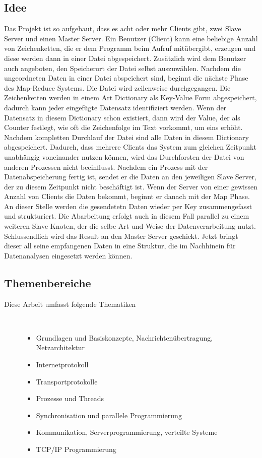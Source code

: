 \documentclass[a4paper,12pt]{article}
\begin{document}
\subsection{Idee}
Das Projekt ist so aufgebaut, dass es acht oder mehr Clients gibt, zwei Slave Server und einen Master Server. 
Ein Benutzer (Client) kann eine beliebige Anzahl von Zeichenketten, die er dem Programm beim Aufruf mitübergibt, 
erzeugen und diese werden dann in einer Datei abgespeichert. 
Zusätzlich wird dem Benutzer auch angeboten, den Speicherort der Datei selbst auszuwählen. 
Nachdem die ungeordneten Daten in einer Datei 
abspeichert sind, beginnt die nächste Phase des Map-Reduce Systems.
Die Datei wird zeilenweise durchgegangen. 
Die Zeichenketten werden in einem Art Dictionary als Key-Value Form abgespeichert, dadurch kann jeder eingefügte Datensatz identifiziert werden. 
Wenn der Datensatz in diesem Dictionary schon existiert, dann wird der Value, der als Counter festlegt, wie oft die Zeichenfolge im Text vorkommt, um eins erhöht. 
Nachdem kompletten Durchlauf der Datei sind alle Daten in diesem Dictionary abgespeichert. 
Dadurch, dass mehrere Clients das System zum gleichen Zeitpunkt unabhängig voneinander nutzen können, wird das Durchforsten der Datei von anderen Prozessen nicht beeinflusst. 
Nachdem ein Prozess mit der Datenabspeicherung fertig ist, sendet er die Daten an den jeweiligen Slave Server, der zu diesem Zeitpunkt nicht beschäftigt ist. 
Wenn der Server von einer gewissen Anzahl von Clients die Daten bekommt, beginnt er danach mit der Map Phase. 
An dieser Stelle werden die gesendetetn Daten wieder per Key zusammengefasst und strukturiert. 
Die Abarbeitung erfolgt auch in diesem Fall parallel zu einem weiteren Slave Knoten, der die selbe Art und Weise der Datenverarbeitung nutzt. 
Schlussendlich wird das Result an den Master Server geschickt. Jetzt bringt dieser all seine empfangenen Daten in eine Struktur, die im Nachhinein für Datenanalysen eingesetzt werden können.
\subsection{Themenbereiche}
\begin{description}
    \item[Diese Arbeit umfasst folgende Thematiken] ~\par
    \begin{itemize}
        \item Grundlagen und Basiskonzepte, Nachrichtenübertragung, Netzarchitektur
        \item Internetprotokoll
        \item Transportprotokolle
        \item Prozesse und Threads
        \item Synchronisation und parallele Programmierung
        \item Kommunikation, Serverprogrammierung, verteilte Systeme
        \item TCP/IP Programmierung      
    \end{itemize} 
\end{description}
\newpage
\end{document}
